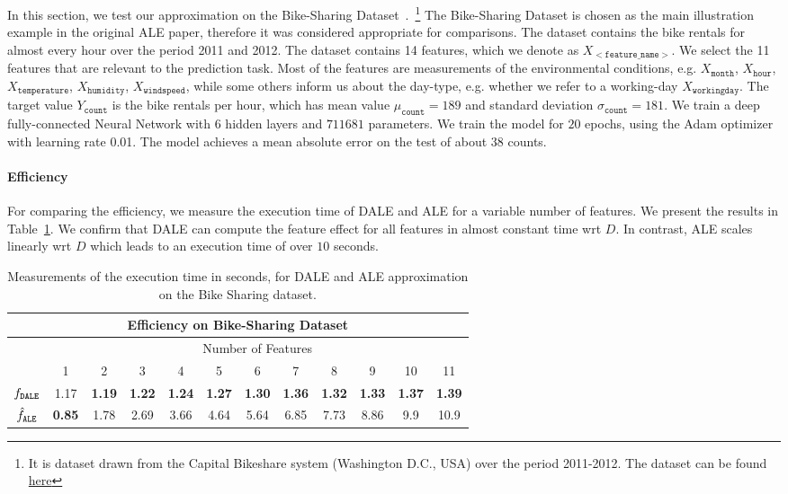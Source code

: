 In this section, we test our approximation on the Bike-Sharing
Dataset~\cite{BikeSharing}.~\footnote{It is dataset drawn from the
  Capital Bikeshare system (Washington D.C., USA) over the period
  2011-2012. The dataset can be found
  \href{https://archive.ics.uci.edu/ml/machine-learning-databases/00275/Bike-Sharing-Dataset.zip}{here}}
The Bike-Sharing Dataset is chosen as the main illustration example in
the original ALE paper, therefore it was considered appropriate for
comparisons. The dataset contains the bike rentals for almost every
hour over the period 2011 and 2012. The dataset contains 14 features,
which we denote as \( X_{\mathtt{<feature\_name>}} \). We select the
11 features that are relevant to the prediction task. Most of the
features are measurements of the environmental conditions, e.g.
\(X_{\mathtt{month}}\), \(X_{\mathtt{hour}}\),
\(X_{\mathtt{temperature}}\), \(X_{\mathtt{humidity}}\),
\(X_{\mathtt{windspeed}}\), while some others inform us about the
day-type, e.g. whether we refer to a working-day
\(X_{\mathtt{workingday}}\). The target value \( Y_{\mathtt{count}}\)
is the bike rentals per hour, which has mean value
\(\mu_{\mathtt{count}} = 189\) and standard deviation
\(\sigma_{\mathtt{count}} = 181\). We train a deep fully-connected
Neural Network with 6 hidden layers and \(711681\) parameters. We
train the model for \(20\) epochs, using the Adam optimizer with
learning rate 0.01. The model achieves a mean absolute error on the
test of about \(38\) counts.

\paragraph{Efficiency} For comparing the efficiency, we measure the
execution time of DALE and ALE for a variable number of features. We
present the results in Table~\ref{tab:bike-sharing-efficiency}. We
confirm that DALE can compute the feature effect for all features in
almost constant time wrt \(D\). In contrast, ALE scales linearly wrt
\(D\) which leads to an execution time of over \(10\) seconds.

\begin{table}
  \caption{Measurements of the execution time in seconds, for DALE and ALE approximation
    on the Bike Sharing dataset.}
  \label{tab:bike-sharing-efficiency}
  \centering
  \begin{tabular}{c|c|c|c|c|c|c|c|c|c|c|c}
    \multicolumn{12}{c}{Efficiency on Bike-Sharing Dataset} \\
    \hline\hline
    & \multicolumn{11}{|c}{Number of Features} \\
    \hline
    & 1 & 2 & 3 & 4 & 5 & 6 & 7 & 8 & 9 & 10 & 11 \\
    \hline
    \( f_{\mathtt{DALE}} \) & 1.17 & \textbf{1.19} & \textbf{1.22} & \textbf{1.24} & \textbf{1.27} & \textbf{1.30} & \textbf{1.36} & \textbf{1.32} & \textbf{1.33} & \textbf{1.37} & \textbf{1.39} \\
    \hline
    \( \hat{f}_{\mathtt{ALE}} \) & \textbf{0.85} & 1.78 & 2.69 & 3.66 & 4.64 & 5.64 & 6.85 & 7.73 & 8.86 & 9.9 & 10.9 \\
    \hline
  \end{tabular}
\end{table}

